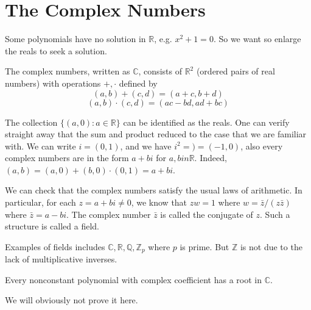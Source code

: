 \section{The Complex Numbers}
Some polynomials have no solution in $\mathbb R$, e.g. $x^2+1=0$.
So we want so enlarge the reals to seek a solution.
\begin{definition}
    The complex numbers, written as $\mathbb C$, consists of $\mathbb R^2$ (ordered pairs of real numbers) with operations $+,\cdot$ defined by
    $$(a,b)+(c,d)=(a+c,b+d)$$
    $$(a,b)\cdot(c,d)=(ac-bd,ad+bc)$$
\end{definition}
The collection $\{(a,0):a\in\mathbb R\}$ can be identified as the reals.
One can verify straight away that the sum and product reduced to the case that we are familiar with.
We can write $i=(0,1)$, and we have $i^2=)=(-1,0)$, also every complex numbers are in the form $a+bi$ for $a,bin\mathbb R$.
Indeed, $(a,b)=(a,0)+(b,0)\cdot (0,1)=a+bi$.
\begin{remark}
    We can check that the complex numbers satisfy the usual laws of arithmetic.
    In particular, for each $z=a+bi\neq 0$, we know that $zw=1$ where $w=\bar z/(z\bar z)$ where $\bar z=a-bi$.
    The complex number $\bar z$ is called the conjugate of $z$.
    Such a structure is called a field.
\end{remark}
Examples of fields includes $\mathbb C,\mathbb R,\mathbb Q,\mathbb Z_p$ where $p$ is prime.
But $\mathbb Z$ is not due to the lack of multiplicative inverses.
\begin{theorem}
    Every nonconstant polynomial with complex coefficient has a root in $\mathbb C$.
\end{theorem}
We will obviously not prove it here.